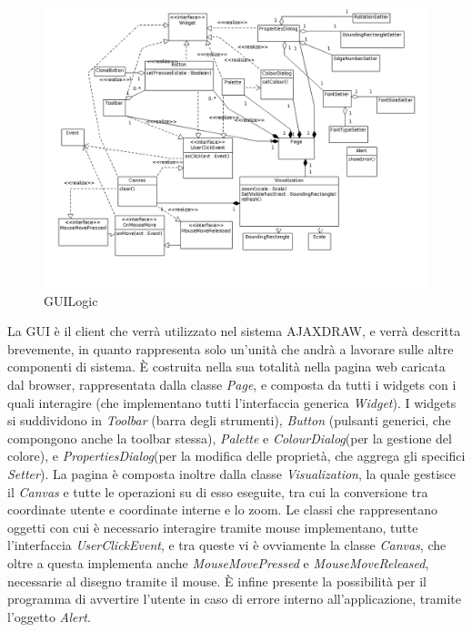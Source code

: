 \newpage

\begin{figure}[!ht]
\centering
\includegraphics[scale=0.5]{images/GUIlogic.png}
\caption{GUILogic}
\end{figure}
La GUI \` e  il client che verr\` a utilizzato nel sistema AJAXDRAW, e verr\` a descritta brevemente, in quanto rappresenta solo un'unit\` a che andr\`  a a lavorare sulle altre componenti di sistema. \` E costruita nella sua totalit\` a nella pagina web caricata dal browser, rappresentata dalla classe \textit{Page}, e composta da tutti i widgets con i quali interagire (che implementano tutti l'interfaccia generica \textit{Widget}).  I widgets si suddividono in \textit{Toolbar} (barra degli strumenti), \textit{Button} (pulsanti generici, che compongono anche la toolbar stessa), \textit{Palette} e \textit{ColourDialog}(per la gestione del colore), e \textit{PropertiesDialog}(per la modifica delle propriet\` a, che aggrega gli specifici \textit{Setter}). La pagina \` e composta inoltre dalla classe \textit{Visualization}, la quale gestisce il \textit{Canvas} e tutte le operazioni su di esso eseguite, tra cui la conversione tra coordinate utente e coordinate interne e lo zoom. Le classi che rappresentano oggetti con cui \`e necessario interagire tramite mouse implementano, tutte l'interfaccia \textit{UserClickEvent}, e tra queste vi \` e ovviamente la classe \textit{Canvas}, che oltre a questa implementa anche \textit{MouseMovePressed} e \textit{MouseMoveReleased}, necessarie al disegno tramite il mouse.  \` E infine presente la possibilit\` a per il programma di avvertire l'utente in caso di errore interno all'applicazione, tramite l'oggetto \textit{Alert}. \\ \\ \\

